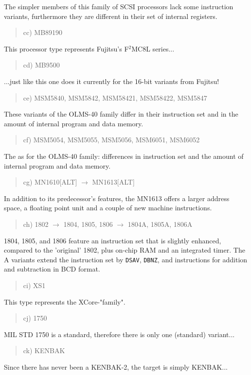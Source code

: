 \documentclass[12pt,twoside]{report}
\newcommand{\tty}[1]{{\tt #1}}
\begin{document}
The simpler members of this family of SCSI processors lack some
instruction variants, furthermore they are different in their set of
internal registers.
\begin{quote}
cc) MB89190
\end{quote}
This processor type represents Fujitsu's F$^{2}$MC8L series...
\begin{quote}
cd) MB9500
\end{quote}
...just like this one does it currently for the 16-bit variants from
Fujitsu!
\begin{quote}
ce) MSM5840, MSM5842, MSM58421, MSM58422, MSM5847
\end{quote}
These variants of the OLMS-40 family differ in their instruction
set and in the amount of internal program and data memory.
\begin{quote}
cf) MSM5054, MSM5055, MSM5056, MSM6051, MSM6052
\end{quote}
The as for the OLMS-40 family: differences in instruction
set and the amount of internal program and data memory.
\begin{quote}
cg) MN1610[ALT] $\rightarrow$ MN1613[ALT]
\end{quote}
In addition to its predecessor's features, the MN1613 offers a larger
address space, a floating point unit and a couple of new machine
instructions.
\begin{quote}
ch) 1802 $\rightarrow$ 1804, 1805, 1806 $\rightarrow$ 1804A,
1805A, 1806A
\end{quote}
1804, 1805, and 1806 feature an instruction set that is slightly
enhanced, compared to the 'original' 1802, plus on-chip RAM and
an integrated timer.  The A variants extend the instruction set by
\tty{DSAV}, \tty{DBNZ}, and instructions for addition and
subtraction in BCD format.
\begin{quote}
ci) XS1
\end{quote}
This type represents the XCore-"family".
\begin{quote}
cj) 1750
\end{quote}
MIL STD 1750 is a standard, therefore there is only one
(standard) variant...
\begin{quote}
ck) KENBAK
\end{quote}
Since there has never been a KENBAK-2, the target is simply KENBAK...
\end{document}

